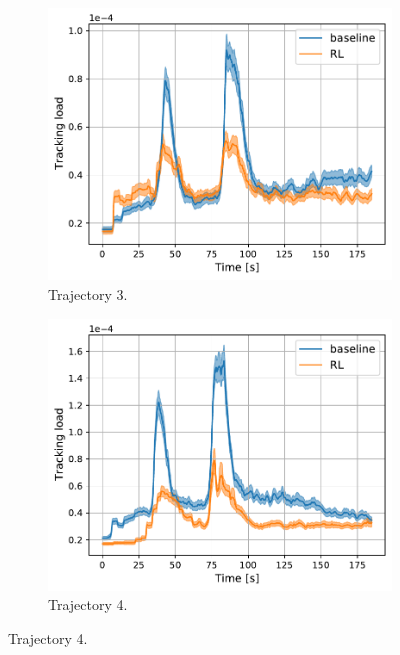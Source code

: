 \documentclass[english, 12pt, a4paper, elec, utf8, a-1b, online]{aaltothesis}
\begin{document}
\begin{figure}
\begin{subfigure}[b]{0.45\textwidth}
        \label{fig:TL_T2}
    \end{subfigure}
    \hfill
    \begin{subfigure}[b]{0.45\textwidth}
        \centering
        \includegraphics[width=\linewidth]{figures/benchmark/Simulations/tracking_load_2.pdf}
        \caption{Trajectory 3.}
        \label{fig:TL_T3}
    \end{subfigure}
    \hfill
    \begin{subfigure}[b]{0.45\textwidth}
        \centering
        \includegraphics[width=\linewidth]{figures/benchmark/Simulations/tracking_load_3.pdf}
        \caption{Trajectory 4.}

\end{subfigure}
\end{figure}
\end{document}
